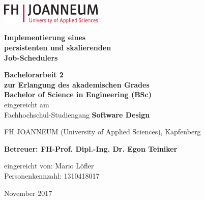 \chapterend
{}
\begin{titlepage}

\begin{center}
\includegraphics[height=1cm]{images/logo_FHJ_100mm_cmyk}
\hfill

\mbox{}\vfill

  \large

  {\huge\bf Implementierung eines \\persistenten und skalierenden\\Job-Schedulers}

  \vspace{2.0cm}

  {\bf Bachelorarbeit 2}\\
{\bf zur Erlangung des akademischen Grades\\ Bachelor of Science in Engineering (BSc)}\\
eingereicht am\\
Fachhochschul-Studiengang {\bf Software Design} 


  \vspace{0.5cm}

 FH JOANNEUM  (University of Applied Sciences), Kapfenberg

  \vspace{1.5cm}

  \mbox{}

  {\bf Betreuer: FH-Prof. Dipl.-Ing. Dr. Egon Teiniker

  eingereicht von: Mario Löfler\\
  Personenkennzahl: 1310418017}

  \vspace{1.5cm}

   November 2017

\end{center}
\vfill\mbox{}


\end{titlepage}




\chapterend






\chapterend
